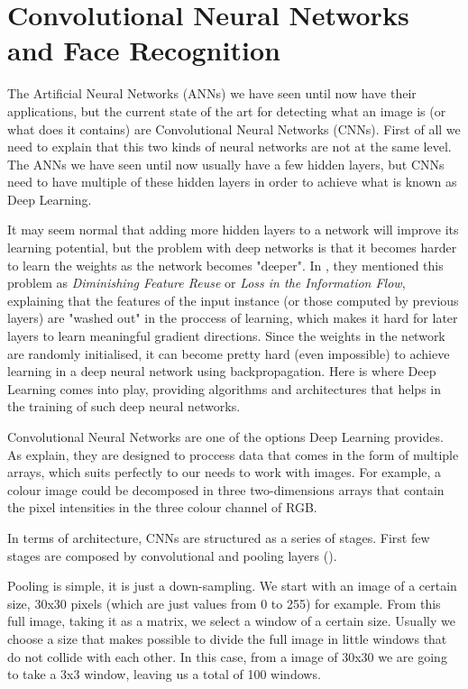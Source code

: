 \section{Convolutional Neural Networks and Face Recognition}
The Artificial Neural Networks (ANNs) we have seen until now have their applications, but the current state of the art for detecting what an image is (or what does it contains) are Convolutional Neural Networks (CNNs). First of all we need to explain that this two kinds of neural networks are not at the same level. The ANNs we have seen until now usually have a few hidden layers, but CNNs need to have multiple of these hidden layers in order to achieve what is known as Deep Learning. 

It may seem normal that adding more hidden layers to a network will improve its learning potential, but the problem with deep networks is that it becomes harder to learn the weights as the network becomes "deeper". In \cite{huang2016deep}, they mentioned this problem as \textit{Diminishing Feature Reuse} or \textit{Loss in the Information Flow}, explaining that the features of the input instance (or those computed by previous layers) are "washed out" in the proccess of learning, which makes it hard for later layers to learn meaningful gradient directions. Since the weights in the network are randomly initialised, it can become pretty hard (even impossible) to achieve learning in a deep neural network using backpropagation. Here is where Deep Learning comes into play, providing algorithms and architectures that helps in the training of such deep neural networks. 

Convolutional Neural Networks are one of the options Deep Learning provides. As \cite{lecun2015deep} explain, they are designed to proccess data that comes in the form of multiple arrays, which suits perfectly to our needs to work with images. For example, a colour image could be decomposed in three two-dimensions arrays that contain the pixel intensities in the three colour channel of RGB. 


In terms of architecture, CNNs are structured as a series of stages. First few stages are composed by convolutional and pooling layers (\cite{lecun2015deep}). 

Pooling is simple, it is just a down-sampling. We start with an image of a certain size, 30x30 pixels (which are just values from 0 to 255) for example. From this full image, taking it as a matrix, we select a window of a certain size. Usually we choose a size that makes possible to divide the full image in little windows that do not collide with each other. In this case, from a image of 30x30 we are going to take a 3x3 window, leaving us a total of 100 windows. 

